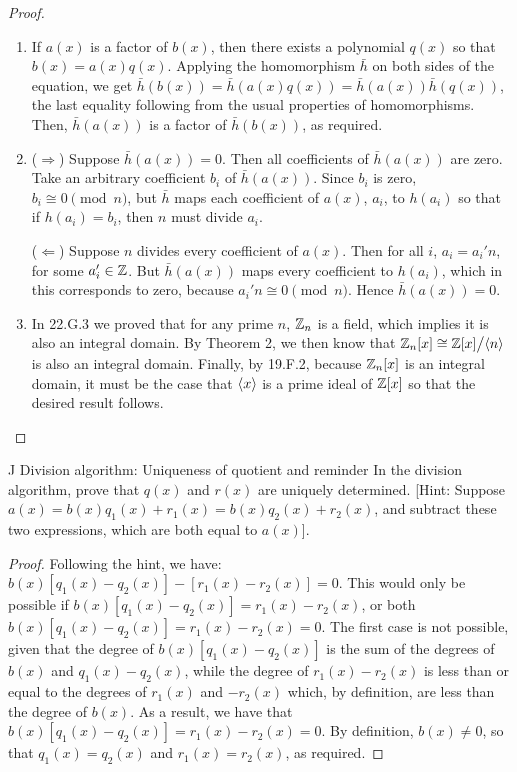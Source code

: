 \begin{proof}
\begin{enumerate}
    ($\Rightarrow$) We will prove this by contrapositive. Suppose $h$ is not injective, so that there exist $a_i, b_i\in A$ so that even though $h(a_i)=h(b_i)$, $a_i\neq b_i$. Now consider the polynomials of degree zero $a(x),b(x)\in A[x]$ given by $a(x)=a_i$ and $b(x)=b_i$. We then have that $\bar{h}(a(x))=h(a_i)=h(b_i)=\bar{h}(b(x))$, however, $a(x)=a_i\neq b_i=b(x)$ so that $\bar{h}$ is not injective.
    \item If $a(x)$ is a factor of $b(x)$, then there exists a polynomial $q(x)$ so that $b(x)=a(x)q(x)$. Applying the homomorphism $\bar{h}$ on both sides of the equation, we get $\bar{h}(b(x))=\bar{h}(a(x)q(x))=\bar{h}(a(x))\bar{h}(q(x))$, the last equality following from the usual properties of homomorphisms. Then, $\bar{h}(a(x))$ is a factor of $\bar{h}(b(x))$, as required.
    \item ($\Rightarrow$) Suppose $\bar{h}(a(x))=0$. Then all coefficients of $\bar{h}(a(x))$ are zero. Take an arbitrary coefficient $b_i$ of $\bar{h}(a(x))$. Since $b_i$ is zero, $b_i\cong 0\pmod{n}$, but $\bar{h}$ maps each coefficient of $a(x)$, $a_i$, to $h(a_i)$ so that if $h(a_i)=b_i$, then $n$ must divide $a_i$.

    ($\Leftarrow$) Suppose $n$ divides every coefficient of $a(x)$. Then for all $i$, $a_i=a_i'n$, for some $a_i'\in\mathbb{Z}$. But $\bar{h}(a(x))$ maps every coefficient to $h(a_i)$, which in this corresponds to zero, because $a_i'n\cong 0\pmod{n}$. Hence $\bar{h}(a(x))=0$.
    \item In 22.G.3 we proved that for any prime $n$, $\mathbb{Z}_n$ is a field, which implies it is also an integral domain. By Theorem 2, we then know that $\mathbb{Z}_n[x]\cong{\textstyle \mathbb{Z}[x]}\big/{\textstyle \langle n\rangle}$ is also an integral domain. Finally, by 19.F.2, because $\mathbb{Z}_n[x]$ is an integral domain, it must be the case that $\langle x\rangle$ is a prime ideal of $\mathbb{Z}[x]$ so that the desired result follows.
\end{enumerate}
\end{proof}

\begin{exercise}{J Division algorithm: Uniqueness of quotient and reminder}
In the division algorithm, prove that $q(x)$ and $r(x)$ are uniquely determined. [Hint: Suppose $a(x)=b(x)q_1(x)+r_1(x)=b(x)q_2(x)+r_2(x)$, and subtract these two expressions, which are both equal to $a(x)$].
\end{exercise}
\begin{proof}
 Following the hint, we have: $b(x)[q_1(x)-q_2(x)]-[r_1(x)-r_2(x)]=0$. This would only be possible if $b(x)[q_1(x)-q_2(x)]=r_1(x)-r_2(x)$, or both $b(x)[q_1(x)-q_2(x)]=r_1(x)-r_2(x)=0$. The first case is not possible, given that the degree of $b(x)[q_1(x)-q_2(x)]$ is the sum of the degrees of $b(x)$ and $q_1(x)-q_2(x)$, while the degree of $r_1(x)-r_2(x)$ is less than or equal to the degrees of $r_1(x)$ and $-r_2(x)$ which, by definition, are less than the degree of $b(x)$. As a result, we have that $b(x)[q_1(x)-q_2(x)]=r_1(x)-r_2(x)=0$. By definition, $b(x)\neq 0$, so that $q_1(x)=q_2(x)$ and $r_1(x)=r_2(x)$, as required. 
\end{proof}
